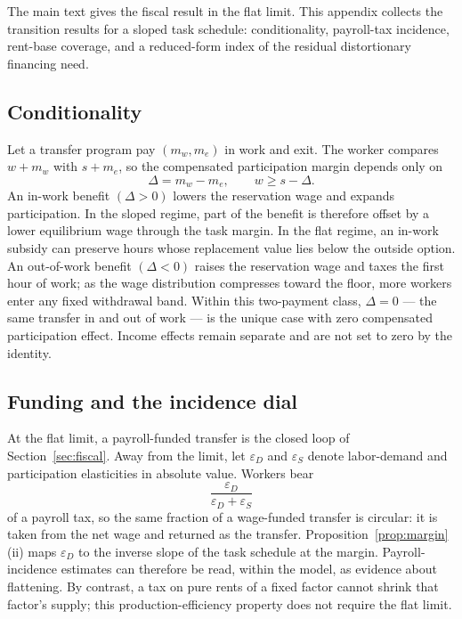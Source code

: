 \documentclass[12pt]{article}
\theoremstyle{plain}
\begin{document}
The main text gives the fiscal result in the flat limit. This appendix collects the transition results for a sloped task schedule: conditionality, payroll-tax incidence, rent-base coverage, and a reduced-form index of the residual distortionary financing need.

\subsection{Conditionality}\label{app:conditionality}

Let a transfer program pay $(m_w,m_e)$ in work and exit. The worker compares $w+m_w$ with $s+m_e$, so the compensated participation margin depends only on
\[
\Delta=m_w-m_e,
\qquad
w\ge s-\Delta.
\]
An in-work benefit $(\Delta>0)$ lowers the reservation wage and expands participation. In the sloped regime, part of the benefit is therefore offset by a lower equilibrium wage through the task margin. In the flat regime, an in-work subsidy can preserve hours whose replacement value lies below the outside option. An out-of-work benefit $(\Delta<0)$ raises the reservation wage and taxes the first hour of work; as the wage distribution compresses toward the floor, more workers enter any fixed withdrawal band. Within this two-payment class, $\Delta=0$ --- the same transfer in and out of work --- is the unique case with zero compensated participation effect. Income effects remain separate and are not set to zero by the identity.

\subsection{Funding and the incidence dial}\label{app:funding}

At the flat limit, a payroll-funded transfer is the closed loop of Section~\ref{sec:fiscal}. Away from the limit, let $\varepsilon_D$ and $\varepsilon_S$ denote labor-demand and participation elasticities in absolute value. Workers bear
\[
\frac{\varepsilon_D}{\varepsilon_D+\varepsilon_S}
\]
of a payroll tax, so the same fraction of a wage-funded transfer is circular: it is taken from the net wage and returned as the transfer. Proposition~\ref{prop:margin}(ii) maps $\varepsilon_D$ to the inverse slope of the task schedule at the margin. Payroll-incidence estimates can therefore be read, within the model, as evidence about flattening. By contrast, a tax on pure rents of a fixed factor cannot shrink that factor's supply; this production-efficiency property does not require the flat limit.
\end{document}
